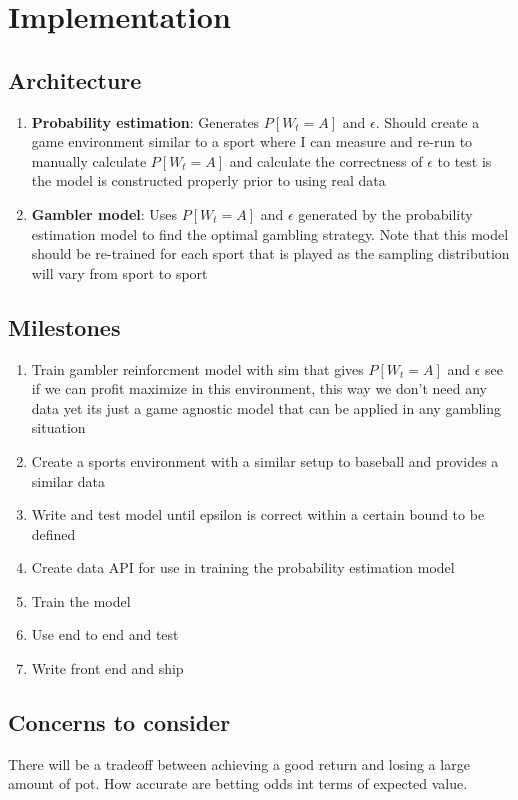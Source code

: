 \documentclass{article}
\begin{document}
    
\section*{Implementation}
    \subsection*{Architecture}

        \begin{enumerate}
            \item \textbf{Probability estimation}: Generates $P[W_t = A]$ and $\epsilon$. Should create a game environment similar to a sport where I can measure and re-run to manually calculate $P[W_t = A]$ and calculate the correctness of $\epsilon$ to test is the model is constructed properly prior to using real data
            \item \textbf{Gambler model}: Uses $P[W_t = A]$ and $\epsilon$ generated by the probability estimation model to find the optimal gambling strategy. Note that this model should be re-trained for each sport that is played as the sampling distribution will vary from sport to sport
        \end{enumerate}
    
    \subsection*{Milestones}
    
        \begin{enumerate}
            \item Train gambler reinforcment model with sim that gives $P[W_t = A]$ and $\epsilon$ see if we can profit maximize in this environment, this way we don't need any data yet its just a game agnostic model that can be applied in any gambling situation
            \item Create a sports environment with a similar setup to baseball and provides a similar data
            \item Write and test model until epsilon is correct within a certain bound to be defined
            \item Create data API for use in training the probability estimation model
            \item Train the model
            \item Use end to end and test
            \item Write front end and ship
        \end{enumerate}

    \subsection*{Concerns to consider}
        There will be a tradeoff between achieving a good return and losing a large amount of pot.
        How accurate are betting odds int terms of expected value.


        
\end{document}

